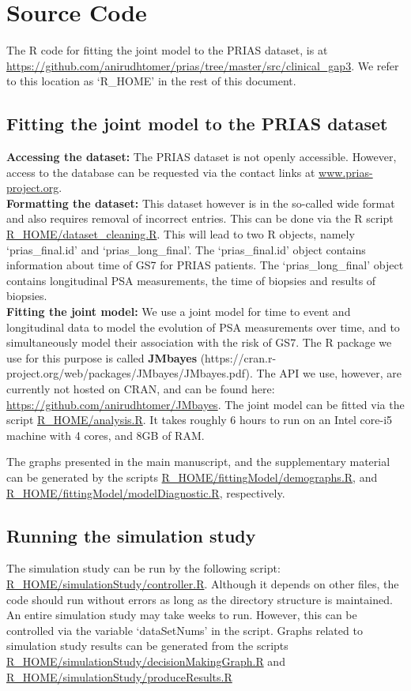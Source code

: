 \section{Source Code}
The R code for fitting the joint model to the PRIAS dataset, is at \url{https://github.com/anirudhtomer/prias/tree/master/src/clinical_gap3}. We refer to this location as `R\_HOME' in the rest of this document.

\subsection{Fitting the joint model to the PRIAS dataset}
\textbf{Accessing the dataset:}
The PRIAS dataset is not openly accessible. However, access to the database can be requested via the contact links at \url{www.prias-project.org}.\\

\textbf{Formatting the dataset:}
This dataset however is in the so-called wide format and also requires removal of incorrect entries. This can be done via the R script \url{R_HOME/dataset_cleaning.R}. This will lead to two R objects, namely `prias\_final.id' and `prias\_long\_final'. The `prias\_final.id' object contains information about time of GS7 for PRIAS patients. The `prias\_long\_final' object contains longitudinal PSA measurements, the time of biopsies and results of biopsies.\\

\textbf{Fitting the joint model:}
We use a joint model for time to event and longitudinal data to model the evolution of PSA measurements over time, and to simultaneously model their association with the risk of GS7. The R package we use for this purpose is called \textbf{JMbayes} (https://cran.r-project.org/web/packages/JMbayes/JMbayes.pdf). The API we use, however, are currently not hosted on CRAN, and can be found here:
\url{https://github.com/anirudhtomer/JMbayes}. The joint model can be fitted via the script \url{R_HOME/analysis.R}. It takes roughly 6 hours to run on an Intel core-i5 machine with 4 cores, and 8GB of RAM. 

The graphs presented in the main manuscript, and the supplementary material can be generated by the scripts \url{R_HOME/fittingModel/demographs.R}, and \url{R_HOME/fittingModel/modelDiagnostic.R}, respectively.

\subsection{Running the simulation study}
The simulation study can be run by the following script: \url{R_HOME/simulationStudy/controller.R}. Although it depends on other files, the code should run without errors as long as the directory structure is maintained. An entire simulation study may take weeks to run. However, this can be controlled via the variable `dataSetNums' in the script. Graphs related to simulation study results can be generated from the scripts \url{R_HOME/simulationStudy/decisionMakingGraph.R} and \url{R_HOME/simulationStudy/produceResults.R} 